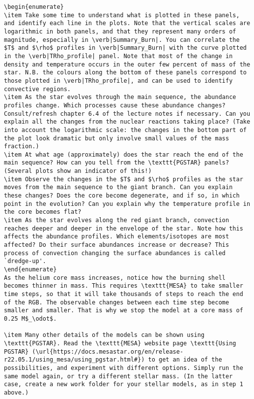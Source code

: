 \documentclass[11pt,a4paper]{article}
\begin{document}
\begin{lstlisting}
\begin{enumerate}
\item Take some time to understand what is plotted in these panels, and identify each line in the plots. Note that the vertical scales are logarithmic in both panels, and that they represent many orders of magnitude, especially in \verb|Summary_Burn|. You can correlate the $T$ and $\rho$ profiles in \verb|Summary_Burn| with the curve plotted in the \verb|TRho_profile| panel. Note that most of the change in density and temperature occurs in the outer few percent of mass of the star. N.B. the colours along the bottom of these panels correspond to those plotted in \verb|TRho_profile|, and can be used to identify convective regions.
\item As the star evolves through the main sequence, the abundance profiles change. Which processes cause these abundance changes? Consult/refresh chapter 6.4 of the lecture notes if necessary. Can you explain all the changes from the nuclear reactions taking place? (Take into account the logarithmic scale: the changes in the bottom part of the plot look dramatic but only involve small values of the mass fraction.)
\item At what age (approximately) does the star reach the end of the main sequence? How can you tell from the \texttt{PGSTAR} panels? (Several plots show an indicator of this!)
\item Observe the changes in the $T$ and $\rho$ profiles as the star moves from the main sequence to the giant branch. Can you explain these changes? Does the core become degenerate, and if so, in which point in the evolution? Can you explain why the temperature profile in the core becomes flat?
\item As the star evolves along the red giant branch, convection reaches deeper and deeper in the envelope of the star. Note how this affects the abundance profiles. Which elements/isotopes are most affected? Do their surface abundances increase or decrease? This process of convection changing the surface abundances is called `dredge-up'.
\end{enumerate}
As the helium core mass increases, notice how the burning shell becomes thinner in mass. This requires \texttt{MESA} to take smaller time steps, so that it will take thousands of steps to reach the end of the RGB. The observable changes between each time step become smaller and smaller. That is why we stop the model at a core mass of 0.25 M$_\odot$.

\item Many other details of the models can be shown using \texttt{PGSTAR}. Read the \texttt{MESA} website page \texttt{Using PGSTAR} (\url{https://docs.mesastar.org/en/release-r22.05.1/using_mesa/using_pgstar.html#}) to get an idea of the possibilities, and experiment with different options. Simply run the same model again, or try a different stellar mass. (In the latter case, create a new work folder for your stellar models, as in step 1 above.)


\end{lstlisting}
\end{document}
